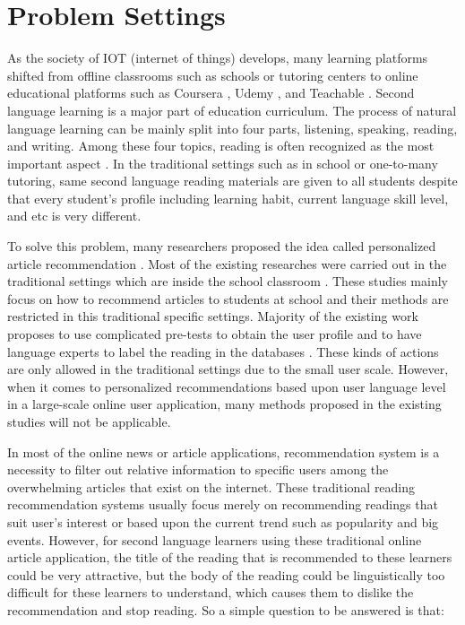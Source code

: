 \chapter{Problem Settings}

As the society of IOT (internet of things) develops, many learning platforms shifted from offline classrooms such as schools or tutoring centers to online educational platforms such as Coursera \cite{Coursera}, Udemy \cite{Udemy}, and Teachable \cite{Teachable}. Second language learning is a major part of education curriculum. The process of natural language learning can be mainly split into four parts, listening, speaking, reading, and writing. Among these four topics, reading is often recognized as the most important aspect \cite{chi2007designing}. In the traditional settings such as in school or one-to-many tutoring, same second language reading materials are given to all students despite that every student's profile including learning habit, current language skill level, and etc is very different. 

To solve this problem, many researchers proposed the idea called personalized article recommendation \cite{Hsu2008, Liu2009, Hsu2013, Tan1998, Kuo2014}. Most of the existing researches were carried out in the traditional settings which are inside the school classroom \cite{Hsu2008, Hsu2013, Kuo2014}. These studies mainly focus on how to recommend articles to students at school and their methods are restricted in this traditional specific settings. Majority of the existing work proposes to use complicated pre-tests to obtain the user profile and to have language experts to label the reading in the databases \cite{Hwang2010}. These kinds of actions are only allowed in the traditional settings due to the small user scale. However, when it comes to personalized recommendations based upon user language level in a large-scale online user application, many methods proposed in the existing studies will not be applicable.

In most of the online news or article applications, recommendation system is a necessity to filter out relative information to specific users among the overwhelming articles that exist on the internet. These traditional reading recommendation systems usually focus merely on recommending readings that suit user's interest or based upon the current trend such as popularity and big events. However, for second language learners using these traditional online article application, the title of the reading that is recommended to these learners could be very attractive, but the body of the reading could be linguistically too difficult for these learners to understand, which causes them to dislike the recommendation and stop reading. So a simple question to be answered is that: 
